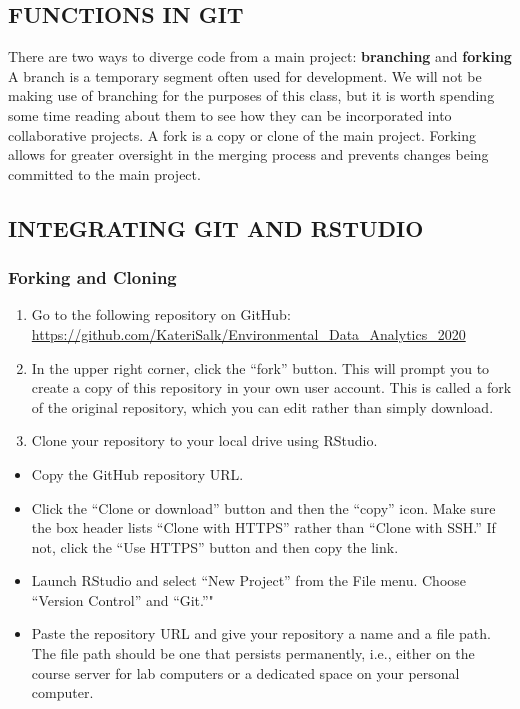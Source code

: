 \documentclass[
]{article}
\begin{document}
\hypertarget{functions-in-git}{%
\subsection{FUNCTIONS IN GIT}\label{functions-in-git}}

There are two ways to diverge code from a main project:
\textbf{branching} and \textbf{forking} A branch is a temporary segment
often used for development. We will not be making use of branching for
the purposes of this class, but it is worth spending some time reading
about them to see how they can be incorporated into collaborative
projects. A fork is a copy or clone of the main project. Forking allows
for greater oversight in the merging process and prevents changes being
committed to the main project.

\hypertarget{integrating-git-and-rstudio}{%
\subsection{INTEGRATING GIT AND
RSTUDIO}\label{integrating-git-and-rstudio}}

\hypertarget{forking-and-cloning}{%
\subsubsection{Forking and Cloning}\label{forking-and-cloning}}

\begin{enumerate}
\def\labelenumi{\arabic{enumi}.}
\item
  Go to the following repository on GitHub:
  \url{https://github.com/KateriSalk/Environmental_Data_Analytics_2020}
\item
  In the upper right corner, click the ``fork'' button. This will prompt
  you to create a copy of this repository in your own user account. This
  is called a fork of the original repository, which you can edit rather
  than simply download.
\item
  Clone your repository to your local drive using RStudio.
\end{enumerate}

\begin{itemize}
\item
  Copy the GitHub repository URL.
\item
  Click the ``Clone or download'' button and then the ``copy'' icon.
  Make sure the box header lists ``Clone with HTTPS'' rather than
  ``Clone with SSH.'' If not, click the ``Use HTTPS'' button and then
  copy the link.
\item
  Launch RStudio and select ``New Project'' from the File menu. Choose
  ``Version Control'' and ``Git.''"
\item
  Paste the repository URL and give your repository a name and a file
  path. The file path should be one that persists permanently, i.e.,
  either on the course server for lab computers or a dedicated space on
  your personal computer.
\end{itemize}
\end{document}
